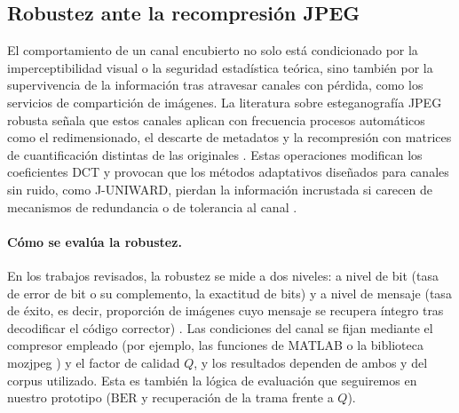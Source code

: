 \documentclass[IB]{TFUOC}%
\begin{document}
\subsection{Robustez ante la recompresión JPEG}
\label{subsec:robustez_jpeg}

El comportamiento de un canal encubierto no solo está condicionado por la imperceptibilidad visual o la seguridad estadística teórica, sino también por la supervivencia de la información tras atravesar canales con pérdida, como los servicios de compartición de imágenes. La literatura sobre esteganografía JPEG robusta señala que estos canales aplican con frecuencia procesos automáticos como el redimensionado, el descarte de metadatos y la recompresión con matrices de cuantificación distintas de las originales \cite{18,20}. Estas operaciones modifican los coeficientes DCT y provocan que los métodos adaptativos diseñados para canales sin ruido, como J-UNIWARD, pierdan la información incrustada si carecen de mecanismos de redundancia o de tolerancia al canal \cite{18}.

\paragraph{Cómo se evalúa la robustez.} En los trabajos revisados, la robustez se mide a dos niveles: a nivel de bit (tasa de error de bit o su complemento, la exactitud de bits) y a nivel de mensaje (tasa de éxito, es decir, proporción de imágenes cuyo mensaje se recupera íntegro tras decodificar el código corrector) \cite{18,20,zhu2018hidden}. Las condiciones del canal se fijan mediante el compresor empleado (por ejemplo, las funciones de MATLAB o la biblioteca mozjpeg \cite{18}) y el factor de calidad $Q$, y los resultados dependen de ambos y del corpus utilizado. Esta es también la lógica de evaluación que seguiremos en nuestro prototipo ($\mathrm{BER}$ y recuperación de la trama frente a $Q$).
\end{document}
